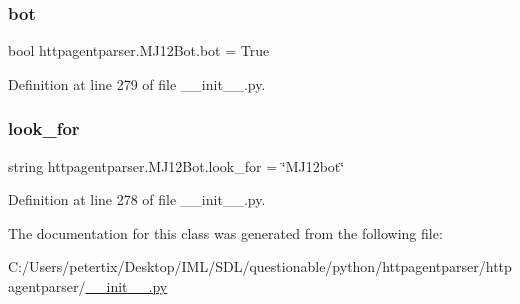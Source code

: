 \subsubsection{\texorpdfstring{bot}{bot}}
{\footnotesize\ttfamily bool httpagentparser.\+M\+J12\+Bot.\+bot = True\hspace{0.3cm}{\ttfamily [static]}}



Definition at line 279 of file \+\_\+\+\_\+init\+\_\+\+\_\+.\+py.

\hypertarget{classhttpagentparser_1_1_m_j12_bot_a878ce1763728e3db7067f23274dcdf1e}{}\label{classhttpagentparser_1_1_m_j12_bot_a878ce1763728e3db7067f23274dcdf1e} 
\subsubsection{\texorpdfstring{look\+\_\+for}{look\_for}}
{\footnotesize\ttfamily string httpagentparser.\+M\+J12\+Bot.\+look\+\_\+for = \char`\"{}M\+J12bot\char`\"{}\hspace{0.3cm}{\ttfamily [static]}}



Definition at line 278 of file \+\_\+\+\_\+init\+\_\+\+\_\+.\+py.



The documentation for this class was generated from the following file\+:\begin{DoxyCompactItemize}
\item 
C\+:/\+Users/petertix/\+Desktop/\+I\+M\+L/\+S\+D\+L/questionable/python/httpagentparser/httpagentparser/\hyperlink{____init_____8py}{\+\_\+\+\_\+init\+\_\+\+\_\+.\+py}\end{DoxyCompactItemize}
